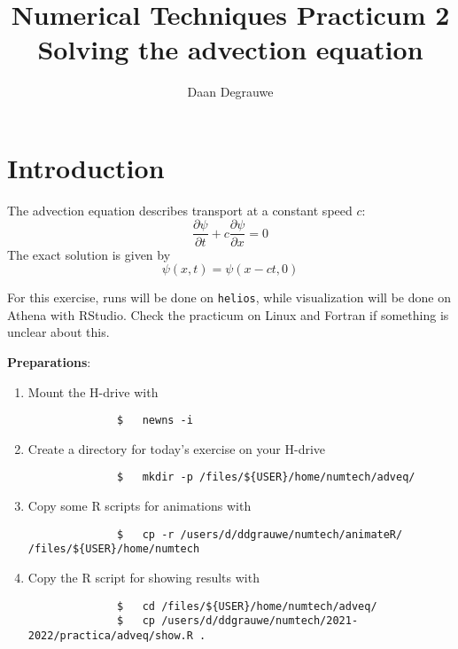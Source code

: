 \documentclass[a4paper]{article}
\title{%
	\bfseries%
	{\large Numerical Techniques Practicum 2}\\[3ex]
	{\Large Solving the advection equation}
}
\author{Daan Degrauwe}
\begin{document}
%
\maketitle
%
\section{Introduction}
%
\par
The advection equation describes transport at a constant speed $c$:
%
\begin{equation}
	\frac{\partial \psi}{\partial t}+c\frac{\partial \psi}{\partial x}=0
\end{equation}
%
The exact solution is given by
%
\begin{equation}
	\psi(x,t)=\psi(x-ct,0)
\end{equation}
%
\par
For this exercise, runs will be done on \verb+helios+, while visualization will be done on Athena with RStudio. Check the practicum on Linux and Fortran if something is unclear about this.
%
\par\vspace*{3ex}
\textbf{Preparations}:
%
\begin{enumerate}
	\item Mount the H-drive with
		\begin{verbatim}
			  $   newns -i
		\end{verbatim}
	\item Create a directory for today's exercise on your H-drive
		\begin{verbatim}
			  $   mkdir -p /files/${USER}/home/numtech/adveq/
		\end{verbatim}
	\item Copy some R scripts for animations with
		\begin{verbatim}
			  $   cp -r /users/d/ddgrauwe/numtech/animateR/ /files/${USER}/home/numtech
		\end{verbatim}
	\item Copy the R script for showing results with
		\begin{verbatim}
			  $   cd /files/${USER}/home/numtech/adveq/
			  $   cp /users/d/ddgrauwe/numtech/2021-2022/practica/adveq/show.R .
		\end{verbatim}
\end{enumerate}
%
\end{document}
